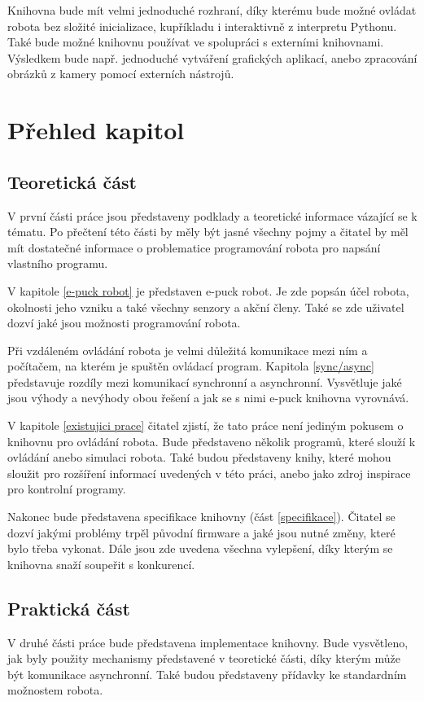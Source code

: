 \documentclass[12pt,notitlepage]{report}
\begin{document}
    Knihovna bude mít velmi jednoduché rozhraní, díky kterému bude možné
    ovládat robota bez složité inicializace, kupříkladu i interaktivně z
    interpretu Pythonu. Také bude možné knihovnu používat ve spolupráci s
    externími knihovnami. Výsledkem bude např. jednoduché vytváření grafických
    aplikací, anebo zpracování obrázků z kamery pomocí externích nástrojů.

    \section{Přehled kapitol}

    \subsection{Teoretická část}
    V první části práce jsou představeny podklady a teoretické informace
    vázající se k tématu. Po přečtení této části by měly být jasné všechny
    pojmy a čitatel by měl mít dostatečné informace o problematice programování
    robota pro napsání vlastního programu.

    V kapitole \ref{e-puck robot} je představen e-puck robot. Je zde popsán
    účel robota, okolnosti jeho vzniku a také všechny senzory a akční členy.
    Také se zde uživatel dozví jaké jsou možnosti programování robota.

    Při vzdáleném ovládání robota je velmi důležitá komunikace mezi ním a
    počítačem, na kterém je spuštěn ovládací program. Kapitola \ref{sync/async}
    představuje rozdíly mezi komunikací synchronní a asynchronní. Vysvětluje
    jaké jsou výhody a nevýhody obou řešení a jak se s nimi e-puck knihovna
    vyrovnává.

    V kapitole \ref{existujici prace} čitatel zjistí, že tato práce není
    jediným pokusem o knihovnu pro ovládání robota. Bude představeno několik
    programů, které slouží k ovládání anebo simulaci robota. Také budou
    představeny knihy, které mohou sloužit pro rozšíření informací uvedených v
    této práci, anebo jako zdroj inspirace pro kontrolní programy.

    Nakonec bude představena specifikace knihovny (část \ref{specifikace}).
    Čitatel se dozví jakými problémy trpěl původní firmware a jaké jsou nutné
    změny, které bylo třeba vykonat. Dále jsou zde uvedena všechna vylepšení,
    díky kterým se knihovna snaží soupeřit s konkurencí.

    \subsection{Praktická část}
    V druhé části práce bude představena implementace knihovny. Bude
    vysvětleno, jak byly použity mechanismy představené v teoretické části,
    díky kterým může být komunikace asynchronní. Také budou představeny
    přídavky ke standardním možnostem robota.
\end{document}
